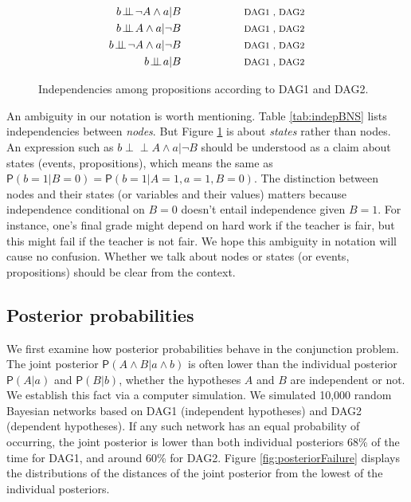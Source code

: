 \documentclass[
  10pt,
  dvipsnames,enabledeprecatedfontcommands]{scrartcl}
\newcommand{\indep}{\!\perp \!\!\! \perp\!}
\newcommand{\n}{\neg}
\newcommand{\et}{\wedge}
\newcommand{\pr}[1]{\ensuremath{\mathsf{P}(#1)}}
\begin{document}
\begin{figure}
\begin{subfigure}[!ht]{0.5\textwidth}
\begin{align}
b\indep \n A \et a \vert B \label{eq:I5a} &\hspace{2cm}\mbox{\footnotesize DAG1 , DAG2}  \\
b\indep A \et a \vert \n B \label{eq:I5b} & \hspace{2cm}\mbox{\footnotesize DAG1 , DAG2} \\
b\indep \n A \et a \vert \n B \label{eq:I5c} & \hspace{2cm}\mbox{\footnotesize DAG1 , DAG2} \\
b \indep a \vert B \label{eq:I6} & \hspace{2cm}\mbox{\footnotesize DAG1 , DAG2} 
\end{align}
\end{subfigure}
\caption{Independencies among propositions according to \textsf{DAG1} and \textsf{DAG2}.} 
\label{tab:indepBNS-states}
\end{figure}

An ambiguity in our notation is worth mentioning. Table
\ref{tab:indepBNS} lists independencies between \emph{nodes}. But Figure
\ref{tab:indepBNS-states} is about \textit{states} rather than nodes. An
expression such as \mbox{$b\indep A \et a \vert \n B$} should be
understood as a claim about states (events, propositions), which means
the same as
\(\pr{b = 1 \vert B = 0} = \pr{b = 1 \vert A = 1, a = 1, B = 0}\). The
distinction between nodes and their states (or variables and their
values) matters because independence conditional on \(B= 0\) doesn't
entail independence given \(B=1\). For instance, one's final grade might
depend on hard work if the teacher is fair, but this might fail if the
teacher is not fair. We hope this ambiguity in notation will cause no
confusion. Whether we talk about nodes or states (or events,
propositions) should be clear from the context.

\hypertarget{posterior-probabilities}{%
\subsection*{Posterior probabilities}\label{posterior-probabilities}}

We first examine how posterior probabilities behave in the conjunction
problem. The joint posterior \(\pr{A\wedge B \vert a\wedge b}\) is often
lower than the individual posterior \(\pr{A \vert a}\) and
\(\pr{B \vert b}\), whether the hypotheses \(A\) and \(B\) are
independent or not. We establish this fact via a computer simulation. We
simulated 10,000 random Bayesian networks based on \textsf{DAG1}
(independent hypotheses) and \textsf{DAG2} (dependent hypotheses). If
any such network has an equal probability of occurring, the joint
posterior is lower than both individual posteriors 68\% of the time for
\textsf{DAG1}, and around 60\% for \textsf{DAG2}. Figure
\ref{fig:posteriorFailure} displays the distributions of the distances
of the joint posterior from the lowest of the individual posteriors.
\end{document}
